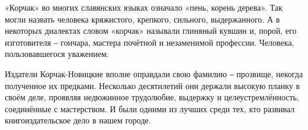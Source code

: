«Корчак» во многих славянских языках означало «пень, корень дерева». Так могли
назвать человека кряжистого, крепкого, сильного, выдержанного. А в некоторых
диалектах словом «корчак» называли глиняный кувшин и, порой, его изготовителя ‒
гончара, мастера почётной и незаменимой профессии. Человека, пользовавшегося
уважением.

Издатели Корчак-Новицкие вполне оправдали свою фамилию ‒ прозвище, некогда
полученное их предками. Несколько десятилетий они держали высокую планку в
своём деле, проявляя недюжинное трудолюбие, выдержку и целеустремлённость,
соединённые с мастерством. И были одними из лучших среди тех, кто развивал
книгоиздательское дело в нашем городе.
